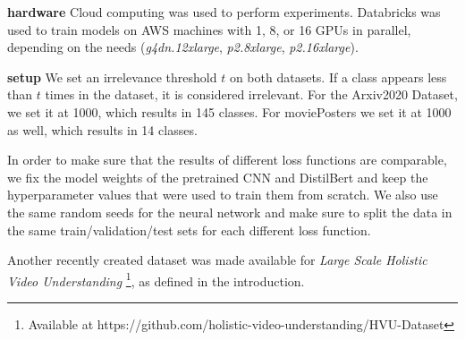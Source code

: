 \textbf{hardware}
Cloud computing was used to perform experiments. Databricks was used to train models on AWS machines with 1, 8, or 16 GPUs in parallel, depending on the needs (\textit{g4dn.12xlarge}, \textit{p2.8xlarge}, \textit{p2.16xlarge}).


\textbf{setup}
We set an irrelevance threshold $t$ on both datasets. If a class appears less than $t$ times in the dataset, it is considered irrelevant. For the Arxiv2020 Dataset, we set it at 1000, which results in 145 classes. For moviePosters we set it at 1000 as well, which results in 14 classes.

In order to make sure that the results of different loss functions are comparable, we fix the model weights of the pretrained CNN and DistilBert and keep the hyperparameter values that were used to train them from scratch. We also use the same random seeds for the neural network and make sure to split the data in the same train/validation/test sets for each different loss function.


Another recently created dataset was made available for \emph{Large Scale Holistic Video Understanding} \cite{holisticVideoData} \footnote{Available at https://github.com/holistic-video-understanding/HVU-Dataset}, as defined in the introduction.











